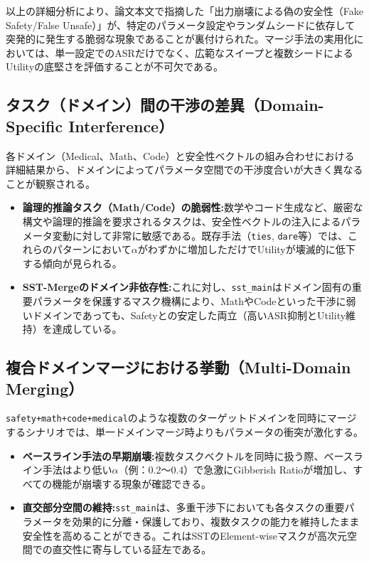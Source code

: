 \documentclass{article}
\begin{document}
以上の詳細分析により、論文本文で指摘した「出力崩壊による偽の安全性（Fake Safety/False Unsafe）」が、特定のパラメータ設定やランダムシードに依存して突発的に発生する脆弱な現象であることが裏付けられた。マージ手法の実用化においては、単一設定でのASRだけでなく、広範なスイープと複数シードによるUtilityの底堅さを評価することが不可欠である。

\subsection{タスク（ドメイン）間の干渉の差異（Domain-Specific Interference）}
各ドメイン（Medical、Math、Code）と安全性ベクトルの組み合わせにおける詳細結果から、ドメインによってパラメータ空間での干渉度合いが大きく異なることが観察される。
\begin{itemize}
    \item \textbf{論理的推論タスク（Math/Code）の脆弱性:}数学やコード生成など、厳密な構文や論理的推論を要求されるタスクは、安全性ベクトルの注入によるパラメータ変動に対して非常に敏感である。既存手法（\texttt{ties}, \texttt{dare}等）では、これらのパターンにおいて$\alpha$がわずかに増加しただけでUtilityが壊滅的に低下する傾向が見られる。
    \item \textbf{SST-Mergeのドメイン非依存性:}これに対し、\texttt{sst\_main}はドメイン固有の重要パラメータを保護するマスク機構により、MathやCodeといった干渉に弱いドメインであっても、Safetyとの安定した両立（高いASR抑制とUtility維持）を達成している。
\end{itemize}

\subsection{複合ドメインマージにおける挙動（Multi-Domain Merging）}
\texttt{safety+math+code+medical}のような複数のターゲットドメインを同時にマージするシナリオでは、単一ドメインマージ時よりもパラメータの衝突が激化する。
\begin{itemize}
    \item \textbf{ベースライン手法の早期崩壊:}複数タスクベクトルを同時に扱う際、ベースライン手法はより低い$\alpha$（例：0.2〜0.4）で急激にGibberish Ratioが増加し、すべての機能が崩壊する現象が確認できる。
    \item \textbf{直交部分空間の維持:}\texttt{sst\_main}は、多重干渉下においても各タスクの重要パラメータを効果的に分離・保護しており、複数タスクの能力を維持したまま安全性を高めることができる。これはSSTのElement-wiseマスクが高次元空間での直交性に寄与している証左である。
\end{itemize}
\end{document}
